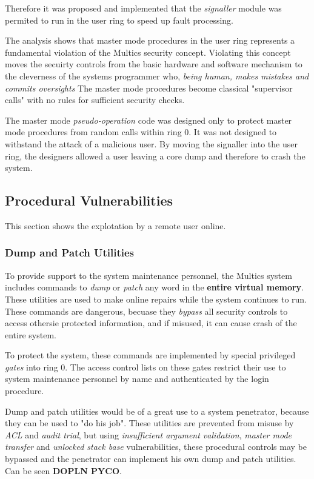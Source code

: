 Therefore it was proposed and implemented that the \textit{signaller} module  was permited to run in the user 
ring to speed up fault processing.

The analysis shows that master mode procedures in the user ring represents a fundamental violation of the Multics 
security concept. Violating this concept moves the secuirty controls from the basic hardware and software mechanism 
to the cleverness of the systems programmer who, \textit{being human, makes mistakes and commits oversights}
The master mode procedures become classical "supervisor calls" with no rules for sufficient security checks.

The master mode \textit{pseudo-operation} code was designed only to protect master mode procedures from random calls 
within ring 0. It was not designed to withstand the attack of a malicious user. By moving the signaller into the user 
ring, the designers allowed a user leaving a core dump and therefore to crash the system.

\subsection{Procedural Vulnerabilities}

This section shows the explotation by a remote user online.

\subsubsection{Dump and Patch Utilities}

To provide support to the system maintenance personnel, the Multics system includes commands to \textit{dump} or 
\textit{patch} any word in the \textbf{entire virtual memory}. These utilities are used to make online repairs while 
the system continues to run. These commands are dangerous, becuase they \textit{bypass} all security controls to 
access othersie protected information, and if misused, it can cause crash of the entire system.

To protect the system, these commands are implemented by special privileged \textit{gates} into ring 0. The access control 
lists on these gates restrict their use to system maintenance personnel by name and authenticated by the login procedure.

Dump and patch utilities would be of a great use to a system penetrator, because they can be used to "do his job". These 
utilities are prevented from misuse by \textit{ACL} and \textit{audit trial}, but using  \textit{insufficient argument
validation}, \textit{master mode transfer} and \textit{unlocked stack base} vulnerabilities, these procedural controls 
may be bypassed and the penetrator can implement his own dump and patch utilities. Can be seen \textbf{DOPLN PYCO}.

